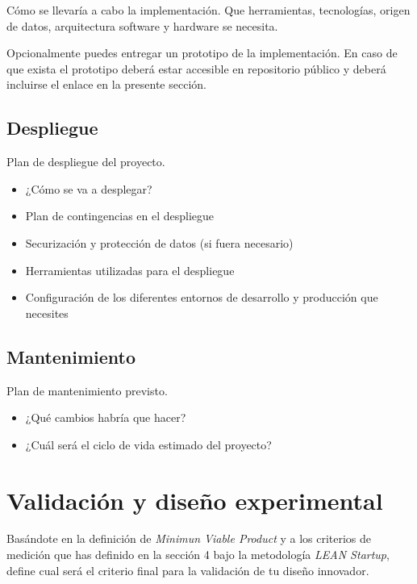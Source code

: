\documentclass[12pt,a4paper]{proyectoinnovacion}
\begin{document}
Cómo se llevaría a cabo la implementación. Que herramientas, tecnologías, origen de datos, arquitectura software y hardware se necesita.

\begin{quotebox}
  Opcionalmente puedes entregar un prototipo de la implementación. En caso de que exista el prototipo deberá estar accesible en repositorio público y deberá incluirse el enlace en la presente sección.
\end{quotebox}

\subsection{Despliegue}

Plan de despliegue del proyecto. 

\begin{itemize}
  \item ¿Cómo se va a desplegar?
  \item Plan de contingencias en el despliegue
  \item Securización y protección de datos (si fuera necesario)
  \item Herramientas utilizadas para el despliegue
  \item Configuración de los diferentes entornos de desarrollo y producción que necesites
\end{itemize}

\subsection{Mantenimiento}

Plan de mantenimiento previsto. 

\begin{itemize}
  \item ¿Qué cambios habría que hacer?
  \item ¿Cuál será el ciclo de vida estimado del proyecto?  
\end{itemize}


\section{Validación y diseño experimental}

Basándote en la definición de \textit{Minimun Viable Product} y a los criterios de medición que has definido en la sección 4 bajo la metodología \textit{LEAN Startup}, define cual será el criterio final para la validación de tu diseño innovador. 
\end{document}
